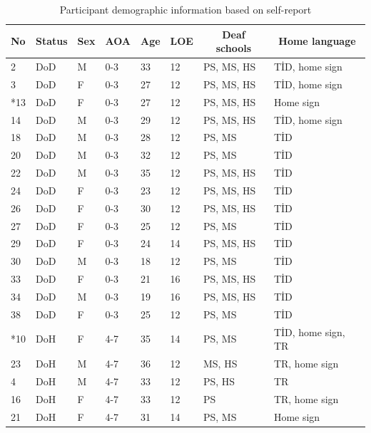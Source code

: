 \documentclass[]{elsarticle} %
\begin{document}
\begin{table}[hbt!]

\begin{center}
\begin{threeparttable}

\caption{\label{tab:unnamed-chunk-2}Participant demographic information based on self-report}

\small{

\begin{tabular}{llllllll}
\toprule
No & \multicolumn{1}{c}{Status} & \multicolumn{1}{c}{Sex} & \multicolumn{1}{c}{AOA} & \multicolumn{1}{c}{Age} & \multicolumn{1}{c}{LOE} & \multicolumn{1}{c}{Deaf schools} & \multicolumn{1}{c}{Home language}\\
\midrule
2 & DoD & M & 0-3 & 33 & 12 & PS, MS, HS & TİD, home sign\\
3 & DoD & F & 0-3 & 27 & 12 & PS, MS, HS & TİD, home sign\\
*13 & DoD & F & 0-3 & 27 & 12 & PS, MS, HS & Home sign\\
14 & DoD & M & 0-3 & 29 & 12 & PS, MS, HS & TİD, home sign\\
18 & DoD & M & 0-3 & 28 & 12 & PS, MS & TİD\\
20 & DoD & M & 0-3 & 32 & 12 & PS, MS & TİD\\
22 & DoD & M & 0-3 & 35 & 12 & PS, MS, HS & TİD\\
24 & DoD & F & 0-3 & 23 & 12 & PS, MS, HS & TİD\\
26 & DoD & F & 0-3 & 30 & 12 & PS, MS, HS & TİD\\
27 & DoD & F & 0-3 & 25 & 12 & PS, MS & TİD\\
29 & DoD & F & 0-3 & 24 & 14 & PS, MS, HS & TİD\\
30 & DoD & M & 0-3 & 18 & 12 & PS, MS & TİD\\
33 & DoD & F & 0-3 & 21 & 16 & PS, MS, HS & TİD\\
34 & DoD & M & 0-3 & 19 & 16 & PS, MS, HS & TİD\\
38 & DoD & F & 0-3 & 25 & 12 & PS, MS & TİD\\
*10 & DoH & F & 4-7 & 35 & 14 & PS, MS & TİD, home sign, TR\\
23 & DoH & M & 4-7 & 36 & 12 & MS, HS & TR, home sign\\
4 & DoH & M & 4-7 & 33 & 12 & PS, HS & TR\\
16 & DoH & F & 4-7 & 33 & 12 & PS & TR, home sign\\
21 & DoH & F & 4-7 & 31 & 14 & PS, MS & Home sign\\

\end{tabular}}
\end{threeparttable}
\end{center}
\end{table}
\end{document}
